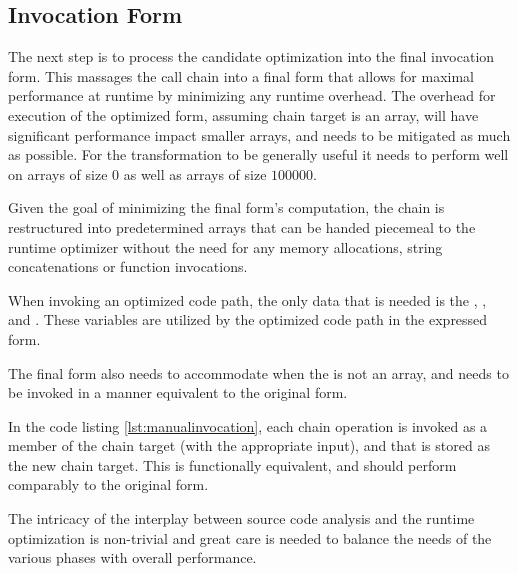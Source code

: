 \subsection{Invocation Form}
The next step is to process the candidate optimization into the final invocation form.  This massages the call chain into a final form that allows for maximal performance at runtime by minimizing any runtime overhead.  The overhead for execution of the optimized form, assuming chain target is an array, will have significant performance impact smaller arrays, and needs to be mitigated as much as possible.  For the transformation to be generally useful it needs to perform well on arrays of size $0$ as well as arrays of size $100000$.  

\begin{minipage}{\linewidth}

\end{minipage}

Given the goal of minimizing the final form's computation, the chain is restructured into predetermined arrays that can be handed piecemeal to the runtime optimizer without the need for any memory allocations, string concatenations or function invocations.

When invoking an optimized code path, the only data that is needed is the , ,  and .  These variables are utilized by the optimized code path in the expressed form. 

The final form also needs to accommodate when the  is not an array, and needs to be invoked in a manner equivalent to the original form.  \\

\begin{minipage}{\linewidth}

\end{minipage}

In the code listing \ref{lst:manualinvocation}, each chain operation is invoked as a member of the chain target (with the appropriate input), and that is stored as the new chain target.  This is functionally equivalent, and should perform comparably to the original form. 




The intricacy of the interplay between source code analysis and the runtime optimization is non-trivial and great care is needed to balance the needs of the various phases with overall performance.  
